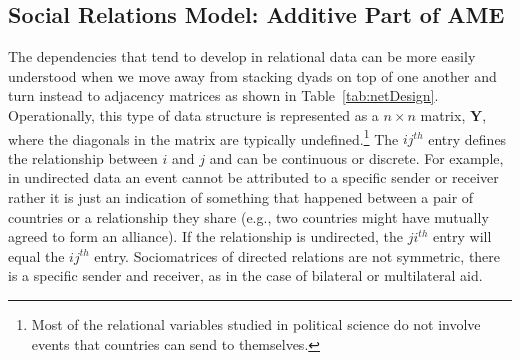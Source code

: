 \subsection{Social Relations Model: Additive Part of AME}

The dependencies that tend to develop in relational data can be more easily understood when we move away from stacking dyads on top of one another and turn instead to adjacency matrices as shown in Table~\ref{tab:netDesign}. Operationally, this type of data structure is represented as a $n \times n$ matrix, $\mathbf{Y}$, where the diagonals in the matrix are typically undefined.\footnote{Most of the relational variables studied in political science do not involve events that countries can send to themselves.} The $ij^{th}$ entry defines the relationship between $i$ and $j$ and can be continuous or discrete. For example, in undirected data an event cannot be attributed to a specific sender or receiver rather it is just an indication of something that happened between a pair of countries or a relationship they share (e.g., two countries might have mutually agreed to form an alliance). If the relationship is undirected, the $ji^{th}$ entry will equal the $ij^{th}$ entry. Sociomatrices of directed relations are not symmetric, there is a specific sender and receiver, as in the case of bilateral or multilateral aid.

